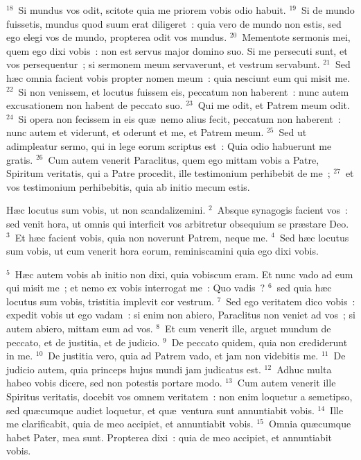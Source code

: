 ${}^{18}$~Si mundus vos odit, scitote quia me priorem vobis odio habuit.
${}^{19}$~Si de mundo fuissetis, mundus quod suum erat diligeret~: quia vero de mundo non estis, sed ego elegi vos de mundo, propterea odit vos mundus.
${}^{20}$~Mementote sermonis mei, quem ego dixi vobis~: non est servus major domino suo. Si me persecuti sunt, et vos persequentur~; si sermonem meum servaverunt, et vestrum servabunt.
${}^{21}$~Sed h\ae c omnia facient vobis propter nomen meum~: quia nesciunt eum qui misit me.
${}^{22}$~Si non venissem, et locutus fuissem eis, peccatum non haberent~: nunc autem excusationem non habent de peccato suo.
${}^{23}$~Qui me odit, et Patrem meum odit.
${}^{24}$~Si opera non fecissem in eis qu\ae\ nemo alius fecit, peccatum non haberent~: nunc autem et viderunt, et oderunt et me, et Patrem meum.
${}^{25}$~Sed ut adimpleatur sermo, qui in lege eorum scriptus est~: Quia odio habuerunt me gratis.
${}^{26}$~Cum autem venerit Paraclitus, quem ego mittam vobis a Patre, Spiritum veritatis, qui a Patre procedit, ille testimonium perhibebit de me~;
${}^{27}$~et vos testimonium perhibebitis, quia ab initio mecum estis.

\lettrine[lines=10,image=true,loversize=0.05,lraise=-0.03]{H}{}\ae c locutus sum vobis, ut non scandalizemini.
${}^{2}$~Absque synagogis facient vos~: sed venit hora, ut omnis qui interficit vos arbitretur obsequium se pr\ae stare Deo.
${}^{3}$~Et h\ae c facient vobis, quia non noverunt Patrem, neque me.
${}^{4}$~Sed h\ae c locutus sum vobis, ut cum venerit hora eorum, reminiscamini quia ego dixi vobis.


${}^{5}$~H\ae c autem vobis ab initio non dixi, quia vobiscum eram. Et nunc vado ad eum qui misit me~; et nemo ex vobis interrogat me~: Quo vadis~?
${}^{6}$~sed quia h\ae c locutus sum vobis, tristitia implevit cor vestrum.
${}^{7}$~Sed ego veritatem dico vobis~: expedit vobis ut ego vadam~: si enim non abiero, Paraclitus non veniet ad vos~; si autem abiero, mittam eum ad vos.
${}^{8}$~Et cum venerit ille, arguet mundum de peccato, et de justitia, et de judicio.
${}^{9}$~De peccato quidem, quia non crediderunt in me.
${}^{10}$~De justitia vero, quia ad Patrem vado, et jam non videbitis me.
${}^{11}$~De judicio autem, quia princeps hujus mundi jam judicatus est.
${}^{12}$~Adhuc multa habeo vobis dicere, sed non potestis portare modo.
${}^{13}$~Cum autem venerit ille Spiritus veritatis, docebit vos omnem veritatem~: non enim loquetur a semetipso, sed qu\ae cumque audiet loquetur, et qu\ae\ ventura sunt annuntiabit vobis.
${}^{14}$~Ille me clarificabit, quia de meo accipiet, et annuntiabit vobis.
${}^{15}$~Omnia qu\ae cumque habet Pater, mea sunt. Propterea dixi~: quia de meo accipiet, et annuntiabit vobis.


